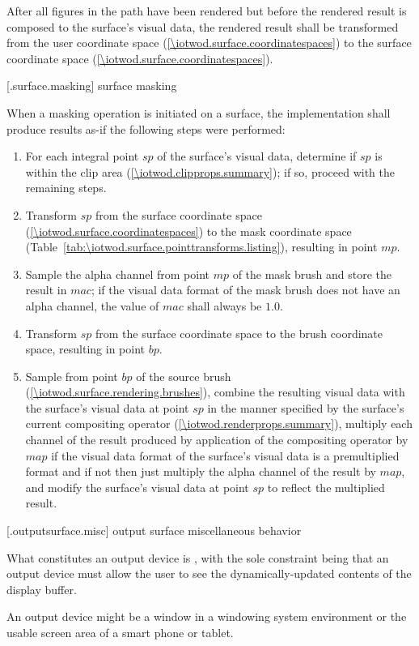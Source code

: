 \pnum
After all figures in the path have been rendered but before the rendered result is composed to the surface's visual data, the rendered result shall be transformed from the user coordinate space (\ref{\iotwod.surface.coordinatespaces}) to the surface coordinate space (\ref{\iotwod.surface.coordinatespaces}).

 [\iotwod.surface.masking] {surface masking}

\pnum
When a masking operation is initiated on a surface, the implementation shall produce results as-if the following steps were performed:

\begin{enumerate}
\item For each integral point $sp$ of the surface's visual data, determine if $sp$ is within the clip area (\ref{\iotwod.clipprops.summary}); if so, proceed with the remaining steps.
\item Transform $sp$ from the surface coordinate space (\ref{\iotwod.surface.coordinatespaces}) to the mask coordinate space (Table~\ref{tab:\iotwod.surface.pointtransforms.listing}), resulting in point $mp$.
\item Sample the alpha channel from point $mp$ of the mask brush and store the result in $mac$; if the visual data format of the mask brush does not have an alpha channel, the value of $mac$ shall always be $1.0$.
\item Transform $sp$ from the surface coordinate space to the brush coordinate space, resulting in point $bp$.
\item Sample from point $bp$ of the source brush (\ref{\iotwod.surface.rendering.brushes}), combine the resulting visual data with the surface's visual data at point $sp$ in the manner specified by the surface's current compositing operator (\ref{\iotwod.renderprops.summary}), multiply each channel of the result produced by application of the compositing operator by $map$ if the visual data format of the surface's visual data is a premultiplied format and if not then just multiply the alpha channel of the result by $map$, and modify the surface's visual data at point $sp$ to reflect the multiplied result.
\end{enumerate}

 [\iotwod.outputsurface.misc] {output surface miscellaneous behavior}

\pnum
What constitutes an output device is , with the sole constraint being that an output device must allow the user to see the dynamically-updated contents of the display buffer.
\begin{example}
An output device might be a window in a windowing system environment or the usable screen area of a smart phone or tablet.
\end{example}


